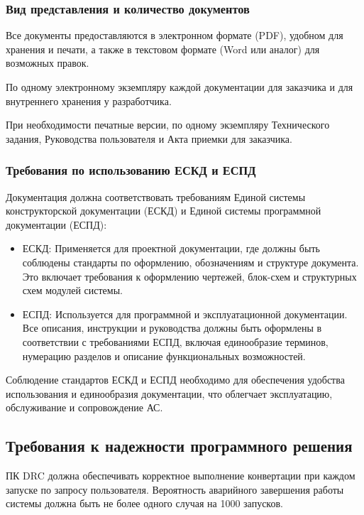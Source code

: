 \subsubsection{Вид представления и количество документов}


Все документы предоставляются в электронном формате (PDF),
удобном для хранения и печати,
а также в текстовом формате (Word или аналог) для возможных правок.


По одному электронному экземпляру каждой документации
для заказчика и для внутреннего хранения у разработчика.

При необходимости печатные версии, по одному экземпляру Технического задания,
Руководства пользователя и Акта приемки для заказчика.

\subsubsection{Требования по использованию ЕСКД и ЕСПД}

Документация должна соответствовать требованиям
Единой системы конструкторской документации (ЕСКД)
и Единой системы программной документации (ЕСПД):

\begin{itemize}
	\item ЕСКД: Применяется для проектной документации,
		где должны быть соблюдены стандарты по оформлению, обозначениям
		и структуре документа.
		Это включает требования к оформлению чертежей,
		блок-схем и структурных схем модулей системы.
	\item ЕСПД: Используется для программной и эксплуатационной документации.
		Все описания, инструкции и руководства должны быть оформлены
		в соответствии с требованиями ЕСПД, включая единообразие терминов,
		нумерацию разделов и описание функциональных возможностей.
\end{itemize}

Соблюдение стандартов ЕСКД и ЕСПД необходимо
для обеспечения удобства использования и единообразия документации,
что облегчает эксплуатацию, обслуживание и сопровождение АС.

\subsection{Требования к надежности программного решения}

ПК DRC должна обеспечивать корректное выполнение конвертации
при каждом запуске по запросу пользователя.
Вероятность аварийного завершения работы системы должна быть
не более одного случая на 1000 запусков.

